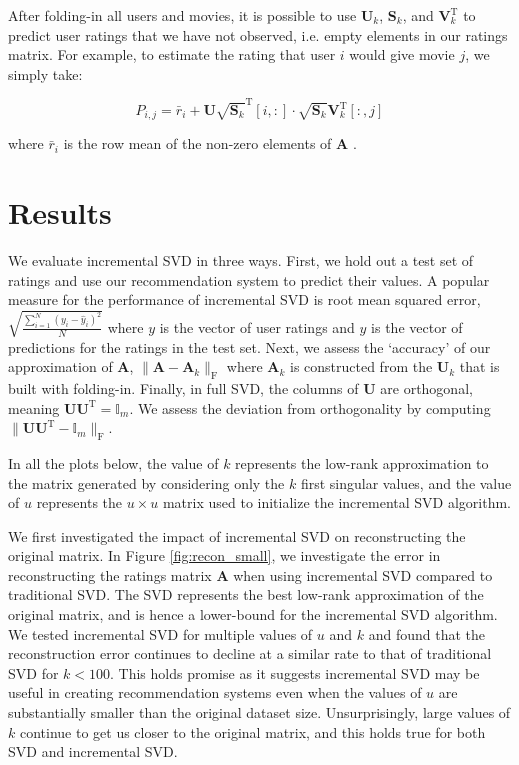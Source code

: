 \documentclass{article} %
\newcommand{\A}{\mathbf{A}}
\newcommand{\T}{\textrm{T}}
\begin{document}
After folding-in all users and movies, it is possible to use $\mathbf{U}_k$, $\mathbf{S}_k$, and $\mathbf{V}_k^{\T}$ to predict user ratings that we have not observed, i.e. empty elements in our ratings matrix.
For example, to estimate the rating that user $i$ would give movie $j$, we simply take:

$$P_{i,j} = \bar{r}_i + \mathbf{U}\sqrt{\mathbf{S}_k}^{\T}[i,:]
\cdot \sqrt{\mathbf{S}_k}\mathbf{V}_k^{\T}[:,j]$$

where $\bar{r}_i$ is the row mean of the non-zero elements of $\A$ \citep{sarwar2002}.

\section{Results}

We evaluate incremental SVD in three ways.
First, we hold out a test set of ratings and use our recommendation system to predict their values.
A popular measure for the performance of incremental SVD is root mean squared error, $\sqrt{\frac{\sum_{i=1}^N \left(y_i - \hat{y}_i\right)^2}{N}}$ where $y$ is the vector of user ratings and $\hat{y}$ is the vector of predictions for the ratings in the test set.
Next, we assess the `accuracy' of our approximation of $\A$, $\|\A - \A_k\|_{\textrm{F}}$ where $\A_k$ is constructed from the $\mathbf{U}_k$ that is built with folding-in.
Finally, in full SVD, the columns of $\mathbf{U}$ are orthogonal, meaning $\mathbf{U}\mathbf{U}^{\T} = \mathbb{I}_m$.
We assess the deviation from orthogonality by computing $\|\mathbf{U}\mathbf{U}^{\T} - \mathbb{I}_m\|_{\textrm{F}}$.

In all the plots below, the value of $k$ represents the low-rank approximation to the matrix generated by considering only the $k$ first singular values, and the value of $u$ represents the $u \times u$ matrix used to initialize the incremental SVD algorithm.

We first investigated the impact of incremental SVD on reconstructing the original matrix.
In Figure \ref{fig:recon_small}, we investigate the error in reconstructing the ratings matrix $\A$ when using incremental SVD compared to traditional SVD.
The SVD represents the best low-rank approximation of the original matrix, and is hence a lower-bound for the incremental SVD algorithm.
We tested incremental SVD for multiple values of $u$ and $k$ and found that the reconstruction error continues to decline at a similar rate to that of traditional SVD for $k < 100$.
This holds promise as it suggests incremental SVD may be useful in creating recommendation systems even when the values of $u$ are substantially smaller than the original dataset size.
Unsurprisingly, large values of $k$ continue to get us closer to the original matrix, and this holds true for both SVD and incremental SVD.
\end{document}
